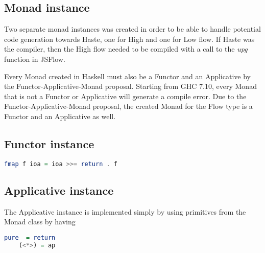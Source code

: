 \subsection{Monad instance}
Two separate monad instances was created in order to be able to handle potential code generation towards Haste, one for High and one for Low flow. If Haste was the compiler, then the High flow needed to be compiled with a call to the \emph{upg} function in JSFlow.

Every Monad created in Haskell must also be a Functor and an Applicative by the Functor-Applicative-Monad proposal\cite{functor_applicative_monad}. Starting from GHC 7.10, every Monad that is not a Functor or Applicative will generate a compile error. Due to the Functor-Applicative-Monad proposal, the created Monad for the Flow type is a Functor and an Applicative as well.

\subsection{Functor instance}
\begin{center}
  \begin{lstlisting}[language=Haskell]
    fmap f ioa = ioa >>= return . f
  \end{lstlisting}
\end{center}

\subsection{Applicative instance}
The Applicative instance is implemented simply by using primitives from the Monad class by having
\begin{center}
  \begin{lstlisting}[language=Haskell]
    pure  = return
    (<*>) = ap
  \end{lstlisting}
\end{center}

